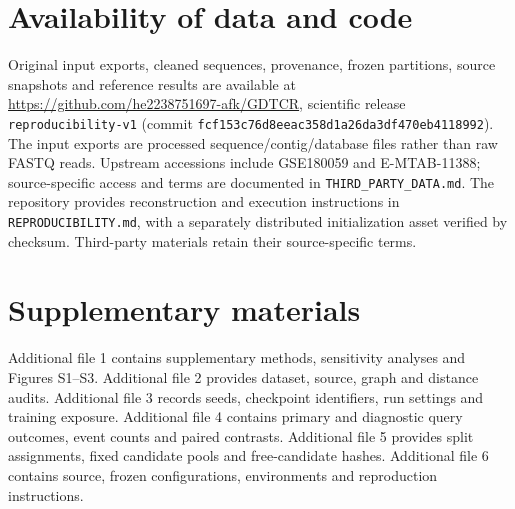 \documentclass[a4paper,11pt]{article}
\begin{document}
\section*{Availability of data and code}
Original input exports, cleaned sequences, provenance, frozen partitions,
source snapshots and reference results are available at
\url{https://github.com/he2238751697-afk/GDTCR}, scientific release
\texttt{reproducibility-v1} (commit
\texttt{fcf153c76d8eeac358d1a26da3df470eb4118992}).
The input exports are processed sequence/contig/database files rather than raw
FASTQ reads. Upstream accessions include GSE180059 and E-MTAB-11388;
source-specific access and terms are documented in
\texttt{THIRD\_PARTY\_DATA.md}. The repository provides reconstruction and
execution instructions in \texttt{REPRODUCIBILITY.md}, with a separately
distributed initialization asset verified by checksum. Third-party materials
retain their source-specific terms.

\section*{Supplementary materials}
Additional file 1 contains supplementary methods, sensitivity analyses and
Figures S1--S3. Additional file 2 provides dataset, source, graph and distance
audits. Additional file 3 records seeds, checkpoint identifiers, run settings
and training exposure. Additional file 4 contains primary and diagnostic
query outcomes, event counts and paired contrasts. Additional file 5 provides
split assignments, fixed candidate pools and free-candidate hashes.
Additional file 6 contains source, frozen configurations, environments and
reproduction instructions.
\end{document}
